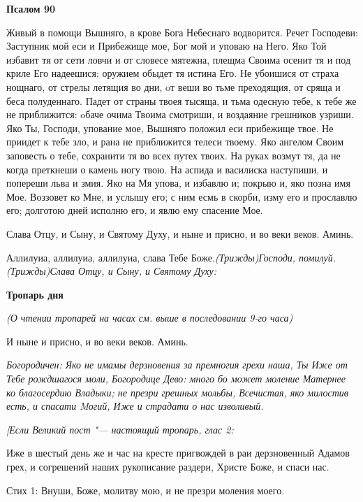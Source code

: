 \medskip
\bfseries Псалом 90\normalfont{}\nopagebreak


Живый в помощи Вышняго, в крове Бога Небеснаго водворится. Речет Господеви: Заступник мой еси и Прибежище мое, Бог мой и уповаю на Него. Яко Той избавит тя от сети ловчи и от словесе мятежна, плещма Своима осенит тя и под криле Его надеешися: оружием обыдет тя истина Его. Не убоишися от страха нощнаго, от стрелы летящия во дни, oт веши во тьме преходящия, от сряща и беса полуденнаго. Падет от страны твоея тысяща, и тьма одесную тебе, к тебе же не приближится: oбаче очима Твоима смотриши, и воздаяние грешников узриши. Яко Ты, Господи, упование мое, Вышняго положил еси прибежище твое. Не приидет к тебе зло, и рана не приближится телеси твоему. Яко ангелом Своим заповесть о тебе, сохранити тя во всех путех твоих. На руках возмут тя, да не когда преткнеши о камень ногу твою. На аспида и василиска наступиши, и попереши льва и змия. Яко на Мя упова, и избавлю и; покрыю и, яко позна имя Мое. Воззовет ко Мне, и услышу его; с ним есмь в скорби, изму его и прославлю его; долготою дней исполню его, и явлю ему спасение Мое.



Слава Отцу, и Сыну, и Святому Духу, и ныне и присно, и во веки веков. Аминь.

Аллилуиа, аллилуиа, аллилуиа, слава Тебе Боже.\itshape  (Трижды)\normalfont{}Господи, помилуй.\itshape  (Трижды)\normalfont{}Слава Отцу, и Сыну, и Святому Духу:


\medskip
\bfseries Тропарь дня\normalfont{}\nopagebreak


\itshape (О чтении тропарей на часах см. выше в последовании 9-го часа)

\normalfont{}И ныне и присно, и во веки веков. Аминь.

\itshape Богородиче\normalfont{}н: Яко не имамы дерзновения за премногия грехи наша, Ты Иже от Тебе рождшагося моли, Богородице Дево: много бо может моление Матернее ко благосердию Владыки; не презри грешных мольбы, Всечистая, яко милостив есть, и спасати Mогий, Иже и страдати о нас изволивый.



\itshape [Если Великий пост "--- настоящий тропарь, глас \normalfont{}2:

Иже в шестый день же и час на кресте пригвождей в раи дерзновенный Адамов грех, и согрешений наших рукописание раздери, Христе Боже, и спаси нас.




Стих 1: Внуши, Боже, молитву мою, и не презри моления моего.




